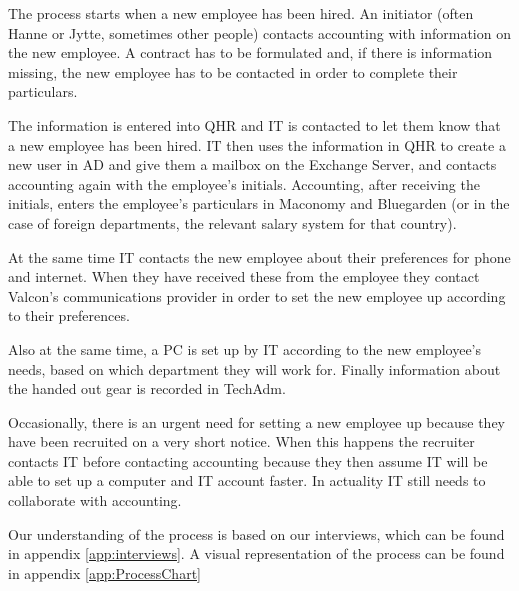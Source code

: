The process starts when a new employee has been hired.
An initiator (often Hanne or Jytte, sometimes other people) contacts accounting with information on the new employee.
A contract has to be formulated and, if there is information missing, the new employee has to be contacted in order to complete their particulars.

The information is entered into QHR and IT is contacted to let them know that a new employee has been hired.
IT then uses the information in QHR to create a new user in AD and give them a mailbox on the Exchange Server, and contacts accounting again with the employee's initials.
Accounting, after receiving the initials, enters the employee's particulars in Maconomy and Bluegarden (or in the case of foreign departments, the relevant salary system for that country).

At the same time IT contacts the new employee about their preferences for phone and internet.
When they have received these from the employee they contact Valcon's communications provider in order to set the new employee up according to their preferences.

Also at the same time, a PC is set up by IT according to the new employee's needs, based on which department they will work for.
Finally information about the handed out gear is recorded in TechAdm.

Occasionally, there is an urgent need for setting a new employee up because they have been recruited on a very short notice. When this happens the recruiter contacts IT before contacting accounting because they then assume IT will be able to set up a computer and IT account faster. In actuality IT still needs to collaborate with accounting.

Our understanding of the process is based on our interviews, which can be found in appendix \ref{app:interviews}.
A visual representation of the process can be found in appendix \ref{app:ProcessChart}